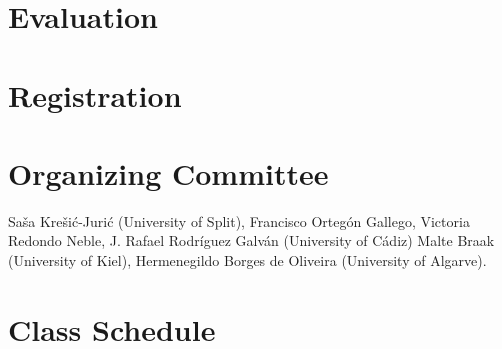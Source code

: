 \documentclass[letterpaper]{inzane_syllabus} %
\begin{document}
\lipsum[2]

\vspace{0.5cm}
\section{Evaluation}

\lipsum[3]

\vspace{0.5cm}
\section{Registration}

\lipsum[4]

\vspace{0.5cm}
\section{Organizing Committee}

Saša Krešić-Jurić (University of Split), Francisco Ortegón Gallego, Victoria Redondo Neble, J. Rafael Rodríguez Galván (University of Cádiz) Malte Braak (University of Kiel), Hermenegildo Borges de Oliveira (University of Algarve). 

\newpage
\makeFullPage
\section{Class Schedule}
\end{document}

